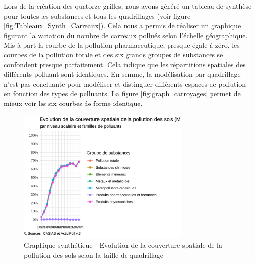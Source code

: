 \documentclass[a4paper,twoside,12pt]{book}
\begin{document}
Lors de la création des quatorze grilles, nous avons généré un tableau de synthèse pour toutes les substances et tous les quadrillages (voir figure \ref{fig:Tableaux_Synth_Carreaux}). Cela nous a permis de réaliser un graphique figurant la variation du nombre de carreaux pollués selon l'échelle géographique. Mis à part la courbe de la pollution pharmaceutique, presque égale à zéro, les courbes de la pollution totale et des six grands groupes de substances se confondent presque parfaitement. Cela indique que les répartitions spatiales des différents polluant sont identiques. En somme, la modélisation par quadrillage n'est pas concluante pour modéliser et distinguer différents espaces de pollution en fonction des types de polluants. La figure \ref{fig:graph_carroyages} permet de mieux voir les six courbes de forme identique. 

\begin{figure}[!h] 
\centering  
\includegraphics[width=0.75\textwidth]{img/chapitre4/Graphique_Evo_Couv_Spa_Carreaux_1graph.png}
\caption{Graphique synthétique - Evolution de la couverture spatiale de la pollution des sols selon la taille de quadrillage} 
\label{fig:graph_evo_couv_1graph}
\end{figure} 
\end{document}
